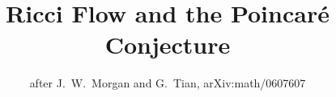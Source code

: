 \title{Ricci Flow and the Poincaré Conjecture}
\author{after J.~W.~Morgan and G.~Tian, arXiv:math/0607607}

